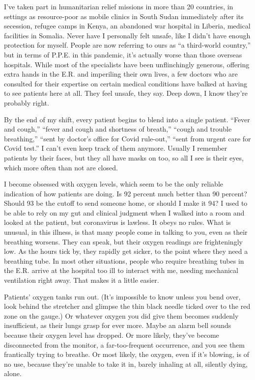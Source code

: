 I've taken part in humanitarian relief missions in more than 20
countries, in settings as resource-poor as mobile clinics in South Sudan
immediately after its secession, refugee camps in Kenya, an abandoned
war hospital in Liberia, medical facilities in Somalia. Never have I
personally felt unsafe, like I didn't have enough protection for myself.
People are now referring to ours as ``a third-world country,'' but in
terms of P.P.E. in this pandemic, it's actually worse than those
overseas hospitals. While most of the specialists have been
unflinchingly generous, offering extra hands in the E.R. and imperiling
their own lives, a few doctors who are consulted for their expertise on
certain medical conditions have balked at having to see patients here at
all. They feel unsafe, they say. Deep down, I know they're probably
right.

By the end of my shift, every patient begins to blend into a single
patient. ``Fever and cough,'' ``fever and cough and shortness of
breath,'' ``cough and trouble breathing,'' ``sent by doctor's office for
Covid rule-out,'' ``sent from urgent care for Covid test.'' I can't even
keep track of them anymore. Usually I remember patients by their faces,
but they all have masks on too, so all I see is their eyes, which more
often than not are closed.

I become obsessed with oxygen levels, which seem to be the only reliable
indication of how patients are doing. Is 92 percent much better than 90
percent? Should 93 be the cutoff to send someone home, or should I make
it 94? I used to be able to rely on my gut and clinical judgment when I
walked into a room and looked at the patient, but coronavirus is
lawless. It obeys no rules. What is unusual, in this illness, is that
many people come in talking to you, even as their breathing worsens.
They can speak, but their oxygen readings are frighteningly low. As the
hours tick by, they rapidly get sicker, to the point where they need a
breathing tube. In most other situations, people who require breathing
tubes in the E.R. arrive at the hospital too ill to interact with me,
needing mechanical ventilation right away. That makes it a little
easier.

Patients' oxygen tanks run out. (It's impossible to know unless you bend
over, look behind the stretcher and glimpse the thin black needle ticked
over to the red zone on the gauge.) Or whatever oxygen you did give them
becomes suddenly insufficient, as their lungs grasp for ever more. Maybe
an alarm bell sounds because their oxygen level has dropped. Or more
likely, they've become disconnected from the monitor, a far-too-frequent
occurrence, and you see them frantically trying to breathe. Or most
likely, the oxygen, even if it's blowing, is of no use, because they're
unable to take it in, barely inhaling at all, silently dying, alone.

